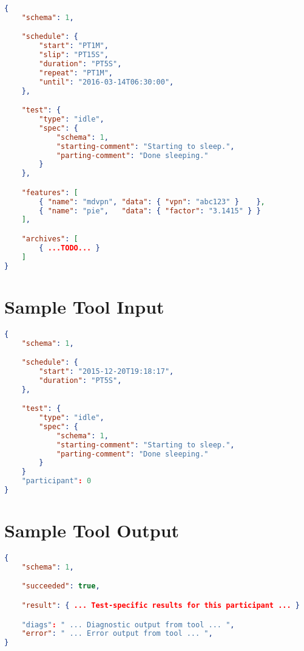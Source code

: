 \documentclass[10pt]{article}
\begin{document}
\begin{lstlisting}[language=json,firstnumber=1]
{
    "schema": 1,

    "schedule": {
        "start": "PT1M",
        "slip": "PT15S",
        "duration": "PT5S",
        "repeat": "PT1M",
        "until": "2016-03-14T06:30:00",
    },

    "test": {
        "type": "idle",
        "spec": {
            "schema": 1,
            "starting-comment": "Starting to sleep.",
            "parting-comment": "Done sleeping."
        }
    },

    "features": [
        { "name": "mdvpn", "data": { "vpn": "abc123" }    },
        { "name": "pie",   "data": { "factor": "3.1415" } }
    ],

    "archives": [
        { ...TODO... }
    ]
}
\end{lstlisting}


\section{Sample Tool Input}

\begin{lstlisting}[language=json,firstnumber=1]
{
    "schema": 1,

    "schedule": {
        "start": "2015-12-20T19:18:17",
        "duration": "PT5S",
    },

    "test": {
        "type": "idle",
        "spec": {
            "schema": 1,
            "starting-comment": "Starting to sleep.",
            "parting-comment": "Done sleeping."
        }
    }
    "participant": 0
}
\end{lstlisting}



\section{Sample Tool Output}

\begin{lstlisting}[language=json,firstnumber=1]
{
    "schema": 1,

    "succeeded": true,

    "result": { ... Test-specific results for this participant ... }

    "diags": " ... Diagnostic output from tool ... ",
    "error": " ... Error output from tool ... ",
}

\end{lstlisting}
\end{document}
